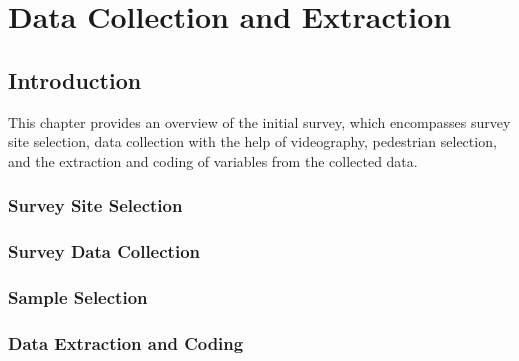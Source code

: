 
\chapter{Data Collection and Extraction}\doublespacing %

\label{Chapter4} %








\section{Introduction}
\noindent

This chapter provides an overview of the initial survey, which encompasses survey site selection, data collection with the help of videography, pedestrian selection, and the extraction and coding of variables from the collected data.



\subsection{Survey Site Selection}
\lipsum[2]



\subsection{Survey Data Collection}
\lipsum[1]





\subsection{Sample Selection}
\lipsum[1-2]



\subsection{Data Extraction and Coding}
\lipsum[13]



